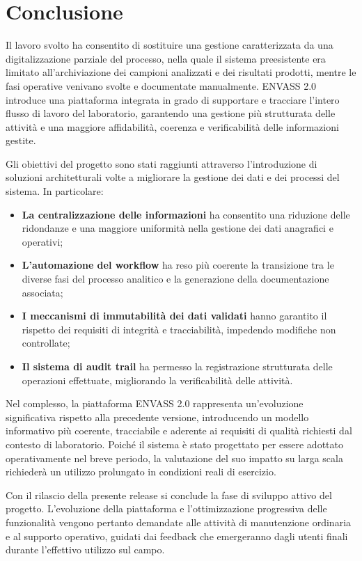 \chapter{Conclusione}
\label{ch:conclusione}
Il lavoro svolto ha consentito di sostituire una gestione caratterizzata da una digitalizzazione parziale del processo, nella quale il sistema preesistente era limitato all'archiviazione dei campioni analizzati e dei risultati prodotti, mentre le fasi operative venivano svolte e documentate manualmente. ENVASS 2.0 introduce una piattaforma integrata in grado di supportare e tracciare l'intero flusso di lavoro del laboratorio, garantendo una gestione più strutturata delle attività e una maggiore affidabilità, coerenza e verificabilità delle informazioni gestite.

Gli obiettivi del progetto sono stati raggiunti attraverso l’introduzione di soluzioni architetturali volte a migliorare la gestione dei dati e dei processi del sistema. In particolare:

\begin{itemize}
	\item \textbf{La centralizzazione delle informazioni} ha consentito una riduzione delle ridondanze e una maggiore uniformità nella gestione dei dati anagrafici e operativi;
	\item \textbf{L'automazione del workflow} ha reso più coerente la transizione tra le diverse fasi del processo analitico e la generazione della documentazione associata;
	\item \textbf{I meccanismi di immutabilità dei dati validati} hanno garantito il rispetto dei requisiti di integrità e tracciabilità, impedendo modifiche non controllate;
	\item \textbf{Il sistema di audit trail} ha permesso la registrazione strutturata delle operazioni effettuate, migliorando la verificabilità delle attività.
\end{itemize}

Nel complesso, la piattaforma ENVASS 2.0 rappresenta un'evoluzione significativa rispetto alla precedente versione, introducendo un modello informativo più coerente, tracciabile e aderente ai requisiti di qualità richiesti dal contesto di laboratorio.
Poiché il sistema è stato progettato per essere adottato operativamente nel breve periodo, la valutazione del suo impatto su larga scala richiederà un utilizzo prolungato in condizioni reali di esercizio.

Con il rilascio della presente release si conclude la fase di sviluppo attivo del progetto. L'evoluzione della piattaforma e l'ottimizzazione progressiva delle funzionalità vengono pertanto demandate alle attività di manutenzione ordinaria e al supporto operativo, guidati dai feedback che emergeranno dagli utenti finali durante l'effettivo utilizzo sul campo.

